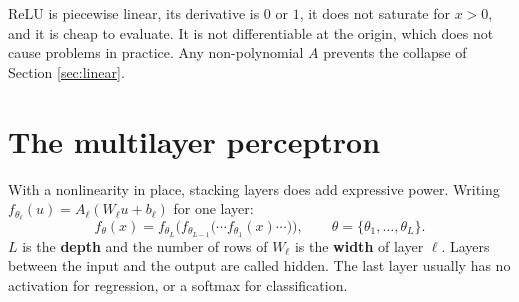 \documentclass[11pt]{article}
\begin{document}
\begin{center}
\end{center}

\noindent
ReLU is piecewise linear, its derivative is $0$ or $1$, it does not saturate for $x>0$,
and it is cheap to evaluate. It is not differentiable at the origin, which does not cause
problems in practice. Any non-polynomial $A$ prevents the collapse of Section
\ref{sec:linear}.

\section{The multilayer perceptron}
\label{sec:mlp}

With a nonlinearity in place, stacking layers does add expressive power. Writing
$f_{\theta_\ell}(u) = A_\ell(W_\ell u + b_\ell)$ for one layer:
%
\[
  f_\theta(x) = f_{\theta_L}\Big(f_{\theta_{L-1}}\big(\cdots f_{\theta_1}(x)\cdots\big)\Big),
  \qquad \theta = \{\theta_1, \ldots, \theta_L\}.
\]
%
$L$ is the \textbf{depth} and the number of rows of $W_\ell$ is the \textbf{width} of
layer $\ell$. Layers between the input and the output are called hidden. The last layer
usually has no activation for regression, or a softmax for classification.
\end{document}
